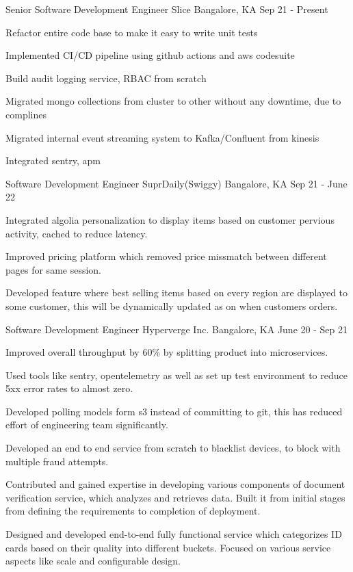 \begin{cventries}
  \cventry
    {Senior Software Development Engineer}
    {Slice}
    {Bangalore, KA}
    {Sep 21 - Present}
    {
      \begin{cvitems}
        \item {Refactor entire code base to make it easy to write unit tests}
        \item {Implemented CI/CD pipeline using github actions and aws codesuite}
        \item {Build audit logging service, RBAC from scratch}
        \item {Migrated mongo collections from cluster to other without any downtime, due to complines}
        \item {Migrated internal event streaming system to Kafka/Confluent from kinesis}
        \item {Integrated sentry, apm}
      \end{cvitems}
    }
  
  \cventry
    {Software Development Engineer}
    {SuprDaily(Swiggy)}
    {Bangalore, KA}
    {Sep 21 - June 22}
    {
      \begin{cvitems}
        \item {Integrated algolia personalization to display items based on customer pervious activity, cached to reduce latency.}
        \item {Improved pricing platform which removed price missmatch between different pages for same session.}
        \item {Developed feature where best selling items based on every region are displayed to some customer, this will be dynamically updated as on when customers orders.}
      \end{cvitems}
    }
  
  \cventry
    {Software Development Engineer}
    {Hyperverge Inc.}
    {Bangalore, KA}
    {June 20 - Sep 21}
    {
      \begin{cvitems}
        \item {Improved overall throughput by 60\% by splitting product into microservices.}
        \item {Used tools like sentry, opentelemetry as well as set up test environment to reduce 5xx error rates to almost zero.}
        \item {Developed polling models form s3 instead of committing to git, this has reduced effort of engineering team significantly.}
        \item {Developed an end to end service from scratch to blacklist devices, to block with multiple fraud attempts.}
        \item {Contributed and gained expertise in developing various components of document verification service, which analyzes and retrieves data. Built it from initial stages from defining the requirements to completion of deployment.}
        \item {Designed and developed end-to-end fully functional service which categorizes ID cards based on their quality into different buckets. Focused on various service aspects like scale and configurable design.}
      \end{cvitems}
    }


\end{cventries}
